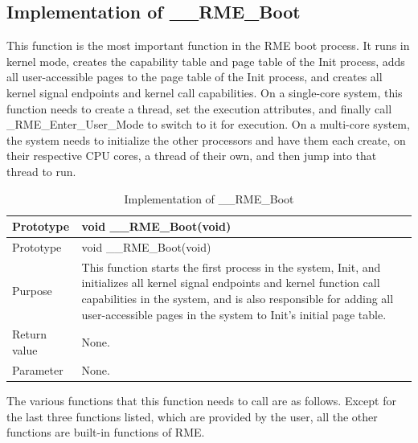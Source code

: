 \subsection{Implementation of \_\_RME\_Boot}\label{subsec:7-rme-boot-implementation}

This function is the most important function in the RME boot process. It runs in kernel mode, creates the capability table and page table of the Init process, adds all user-accessible pages to the page table of the Init process, and creates all kernel signal endpoints and kernel call capabilities. On a single-core system, this function needs to create a thread, set the execution attributes, and finally call \_RME\_Enter\_User\_Mode to switch to it for execution. On a multi-core system, the system needs to initialize the other processors and have them each create, on their respective CPU cores, a thread of their own, and then jump into that thread to run.

\begin{xltabular}{\textwidth}{@{}>{\hsize\raggedright\arraybackslash}X>{\hsize\raggedright\arraybackslash}X@{}}
\caption{Implementation of \_\_RME\_Boot}\label{tab:7-36-rme-boot-implementation}\\
\toprule
Prototype & void \_\_RME\_Boot(void)\tabularnewline
\endfirsthead
\toprule
Prototype & void \_\_RME\_Boot(void)\tabularnewline
\midrule
\endhead
\bottomrule
\endlastfoot
Purpose &
This function starts the first process in the system, Init, and initializes all kernel signal endpoints and kernel function call capabilities in the system, and is also responsible for adding all user-accessible pages in the system to Init's initial page table.\tabularnewline
Return value & None.\tabularnewline
Parameter & None.\tabularnewline
\end{xltabular}
\nopagebreak[4]

The various functions that this function needs to call are as follows. Except for the last three functions listed, which are provided by the user, all the other functions are built-in functions of RME.

